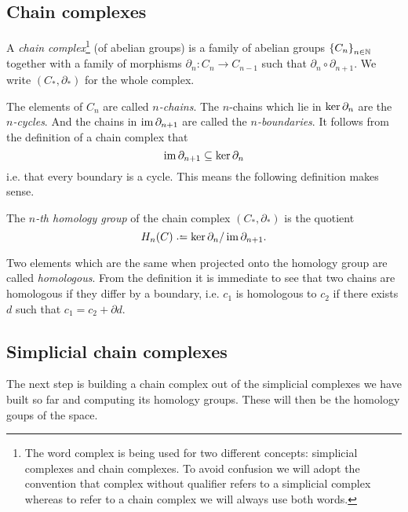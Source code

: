 \documentclass[../main.tex]{subfiles}
\begin{document}
\subsection{Chain complexes}
\begin{definition}
	A \emph{chain complex}\footnote{The word complex is being used for two different
		concepts: simplicial complexes and chain complexes. To avoid confusion we will adopt
		the convention that complex without qualifier refers to a simplicial complex whereas
	to refer to a chain complex we will always use both words.} (of abelian groups) is a
	family of abelian groups \( \left\{ C_n \right\}_{n \in \mathbb{N}} \) together with a family of
	morphisms \( \partial_n \colon C_n \to C_{n-1} \) such that \( \partial_n \circ
	\partial_{n+1} \). We write \( (C_\ast, \partial_\ast) \) for the whole complex. 
\end{definition}
The elements of \( C_n \) are called \emph{\( n \)-chains}. The \( n \)-chains which lie
in \( \ker{\partial}_{n} \) are the \emph{\( n \)-cycles}. And the chains in
\emph{\( \operatorname{im}{\partial}_{n+1} \)} are called the \emph{\( n \)-boundaries}. It
follows from the definition of a chain complex that
\begin{equation*}
	\operatorname{im}{\partial}_{n+1} \subseteq \ker{\partial}_{n}
\end{equation*}
i.e. that every boundary is a cycle. This means the following definition makes sense.
\begin{definition}
	The \emph{\( n \)-th homology group} of the chain complex \( (C_\ast, \partial_\ast) \)
	is the quotient
	\begin{equation*}
		H_n(C) \defeq \cyc{n} / \bound{n+1}.
	\end{equation*}
\end{definition}
Two elements which are the same when projected onto the homology group are called
\emph{homologous}. From the definition it is immediate to see that two chains are
homologous if they differ by a boundary, i.e. \( c_1 \) is homologous to \( c_2 \) if
there exists \( d \) such that \( c_1 = c_2 + \partial d \).

\subsection{Simplicial chain complexes}
The next step is building a chain complex out of the simplicial complexes we have built so
far and computing its homology groups. These will then be the homology goups of the
space. 
\end{document}
